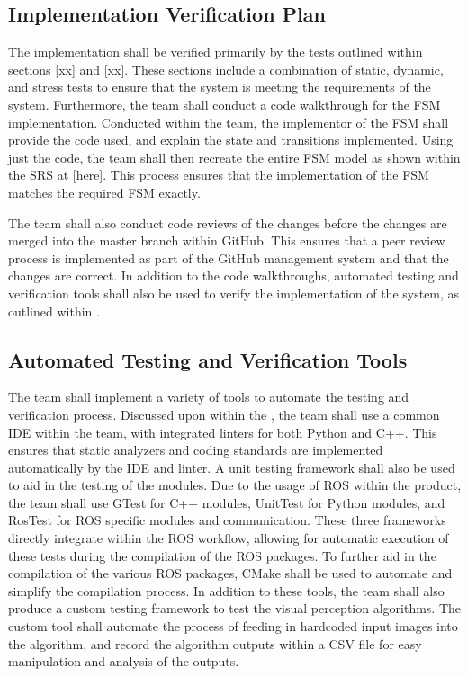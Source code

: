 \documentclass[12pt, titlepage]{article}
\begin{document}
\subsection{Implementation Verification Plan}

The implementation shall be verified primarily by the tests outlined within sections [xx] and [xx]. These sections include a combination of static, dynamic, and stress tests to ensure that the system is meeting the requirements of the system. Furthermore, the team shall conduct a code walkthrough for the FSM implementation. Conducted within the team, the implementor of the FSM shall provide the code used, and explain the state and transitions implemented. Using just the code, the team shall then recreate the entire FSM model as shown within the SRS at [here]. This process ensures that the implementation of the FSM matches the required FSM exactly.  

The team shall also conduct code reviews of the changes before the changes are merged into the master branch within GitHub. This ensures that a peer review process is implemented as part of the GitHub management system and that the changes are correct. In addition to the code walkthroughs, automated testing and verification tools shall also be used to verify the implementation of the system, as outlined within . 


\subsection{Automated Testing and Verification Tools}
\label{automatedVerificationTools}

The team shall implement a variety of tools to automate the testing and verification process. Discussed upon within the , the team shall use a common IDE within the team, with integrated linters for both Python and C++. This ensures that static analyzers and coding standards are implemented automatically by the IDE and linter. A unit testing framework shall also be used to aid in the testing of the modules. Due to the usage of ROS within the product, the team shall use GTest for C++ modules, UnitTest for Python modules, and RosTest for ROS specific modules and communication. These three frameworks directly integrate within the ROS workflow, allowing for automatic execution of these tests during the compilation of the ROS packages. To further aid in the compilation of the various ROS packages, CMake shall be used to automate and simplify the compilation process. In addition to these tools, the team shall also produce a custom testing framework to test the visual perception algorithms. The custom tool shall automate the process of feeding in hardcoded input images into the algorithm, and record the algorithm outputs within a CSV file for easy manipulation and analysis of the outputs. 
\end{document}
